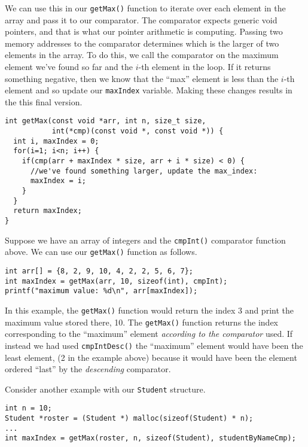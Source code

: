 We can use this in our \texttt{getMax()} function to iterate
over each element in the array and pass it to our comparator.  The
comparator expects generic void pointers, and that is what our pointer
arithmetic is computing.  Passing two memory addresses to the comparator
determines which is the larger of
two elements in the array.  To do this, we
call the comparator on the maximum element we've found so far and the 
$i$-th element in the loop.  If it returns something negative, then we know
that the ``max'' element is less than the $i$-th element and so update our 
\texttt{maxIndex} variable.  Making these changes results in the
this final version.

\begin{verbatim}
int getMax(const void *arr, int n, size_t size, 
           int(*cmp)(const void *, const void *)) {
  int i, maxIndex = 0;
  for(i=1; i<n; i++) {
    if(cmp(arr + maxIndex * size, arr + i * size) < 0) {
      //we've found something larger, update the max_index:
      maxIndex = i;
    }
  }
  return maxIndex;
}
\end{verbatim}

Suppose we have an array of integers and the \texttt{cmpInt()} 
comparator function above.  We can use our \texttt{getMax()}
function as follows.

\begin{verbatim}
int arr[] = {8, 2, 9, 10, 4, 2, 2, 5, 6, 7};
int maxIndex = getMax(arr, 10, sizeof(int), cmpInt);
printf("maximum value: %d\n", arr[maxIndex]);
\end{verbatim}

In this example, the \texttt{getMax()} function would return
the index 3 and print the maximum value stored there, 10.  The 
\texttt{getMax()} function returns the index corresponding to the
``maximum'' element \emph{according to the comparator} used.  If instead
we had used \texttt{cmpIntDesc()} the ``maximum'' element would have
been the least element, (2 in the example above) because it would have
been the element ordered ``last'' by the \emph{descending} comparator.

Consider another example with our \texttt{Student} structure.

\begin{verbatim}
int n = 10;
Student *roster = (Student *) malloc(sizeof(Student) * n);
...
int maxIndex = getMax(roster, n, sizeof(Student), studentByNameCmp);
\end{verbatim}

